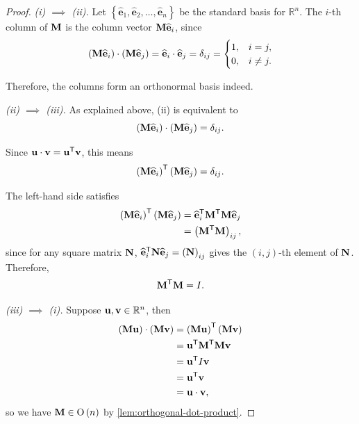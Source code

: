 \documentclass{article}
\theoremstyle{definition}
\theoremstyle{remark}
\newcommand{\pqty}[1]{\left(#1\right)}
\newcommand{\Bqty}[1]{\left\{#1\right\}}
\newcommand{\transpose}{^{\mathsf{T}}}
\newcommand{\RR}{\mathbb{R}}
\newcommand{\identityM}{I}
\newcommand{\unitv}[1]{\widehat{\mathbf{#1}}}
\newcommand{\kronecker}{\delta}
\newcommand{\Or}{\operatorname{O}}
\begin{document}
\begin{proof}
    \emph{(i) \(\implies\) (ii).} Let \(\Bqty{\unitv{e}_1, \unitv{e}_2, \ldots, \unitv{e}_n}\) be the standard basis for \(\RR^n\). The \(i\)-th column of \(\vb{M}\) is the column vector \(\vb{M} \unitv{e}_i\), since
    \[
        \pqty{\vb{M} \unitv{e}_i} \cdot \pqty{\vb{M} \unitv{e}_j} = \unitv{e}_i \cdot \unitv{e}_j = \kronecker_{ij} = \begin{cases}
            1, & i = j, \\
            0, & i \neq j.
        \end{cases}
    \]

    Therefore, the columns form an orthonormal basis indeed.

    \emph{(ii) \(\implies\) (iii).} As explained above, (ii) is equivalent to
    \[
        \pqty{\vb{M} \unitv{e}_i} \cdot \pqty{\vb{M} \unitv{e}_j }= \kronecker_{ij}.
    \]

    Since \(\vb{u} \cdot \vb{v} = \vb{u} \transpose \vb{v}\), this means
    \[
        \pqty{\vb{M} \unitv{e}_i}\transpose \pqty{\vb{M} \unitv{e}_j} = \kronecker_{ij}.
    \]
    
    The left-hand side satisfies
    \begin{align*}
        \pqty{\vb{M} \unitv{e}_i}\transpose \pqty{\vb{M} \unitv{e}_j} &= \unitv{e}_i\transpose \vb{M}\transpose \vb{M} \unitv{e}_j \\
        &= \pqty{\vb{M}\transpose \vb{M}}_{ij},
    \end{align*}
    since for any square matrix \(\vb{N}\), \(\unitv{e}_i \transpose \vb{N} \unitv{e}_j = \pqty{\vb{N}}_{ij}\) gives the \(\pqty{i, j}\)-th element of \(\vb{N}\). Therefore,
    \[
        \vb{M}\transpose \vb{M} = \identityM.
    \]

    \emph{(iii) \(\implies\) (i).} Suppose \(\vb{u}, \vb{v} \in \RR^n\), then
    \begin{align*}
        \pqty{\vb{Mu}} \cdot \pqty{\vb{Mv}} &= \pqty{\vb{Mu}}\transpose \pqty{\vb{Mv}} \\
        &= \vb{u}\transpose \vb{M}\transpose \vb{M} \vb{v} \\
        &= \vb{u}\transpose \identityM \vb{v} \\
        &= \vb{u}\transpose \vb{v} \\
        &= \vb{u} \cdot \vb{v},
    \end{align*}
    so we have \(\vb{M} \in \Or\pqty{n}\) by \autoref{lem:orthogonal-dot-product}.
\end{proof}
\end{document}

